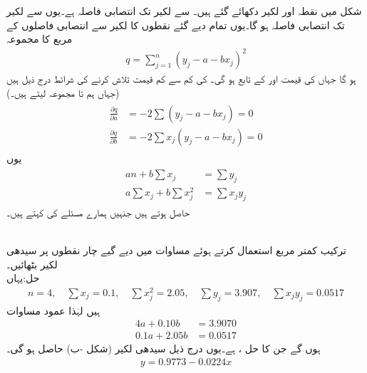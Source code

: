 شکل  میں نقطہ  اور لکیر  دکھائے گئے ہیں۔ سے لکیر تک انتصابی فاصلہ  ہے۔یوں  سے لکیر تک انتصابی فاصلہ  ہو گا۔یوں تمام دیے گئے نقطوں کا لکیر سے انتصابی فاصلوں کے مربع کا مجموعہ
\begin{align*}
q=\sum_{j=1}^{n} (y_j-a-bx_j)^2
\end{align*}
ہو گا جہاں  کی قیمت  اور  کے تابع ہو گی۔ کی کم سے کم قیمت تلاش کرنے کی شرائط درج ذیل ہیں (جہاں ہم  تا  مجموعہ لیتے ہیں۔)
\begin{gather}
\begin{aligned}\label{مساوات_خطی_اعدادی_کمتر_مربع_شرائط_ب}
\frac{\partial q}{\partial a}&=-2\sum(y_j-a-bx_j)=0\\[0.5ex]
\frac{\partial q}{\partial b}&=-2\sum x_j(y_j-a-bx_j)=0
\end{aligned} 
\end{gather}
یوں 
\begin{gather}
\begin{aligned}\label{مساوات_خطی_اعدادی_کمتر_مربع_شرائط_پ}
an+b\sum x_j&=\sum y_j\\[0.5ex]
a\sum x_j+b\sum x_j^2&=\sum x_jy_j
\end{aligned}
\end{gather}
حاصل ہوتے ہیں جنہیں ہمارے مسئلے کی  کہتے ہیں۔

\quad {}\\
ترکیب کمتر مربع استعمال کرتے ہوئے  مساوات  میں دیے گیے چار نقطوں پر  سیدھی لکیر بٹھائیں۔\\
حل:\quad یہاں
\begin{align*}
n=4,\quad \sum x_j=0.1,\quad \sum x_j^2=2.05,\quad \sum y_j=3.907, \quad \sum x_jy_j=0.0517
\end{align*}  
ہیں لہٰذا عمود مساوات
\begin{align*}
4a+0.10b&=3.9070\\
0.1a+2.05b&=0.0517
\end{align*}
ہوں گے جن کا حل ،  ہے۔یوں درج ذیل سیدھی لکیر (شکل -ب) حاصل ہو گی۔
\begin{align*}
y=0.9773-0.0224x
\end{align*}


